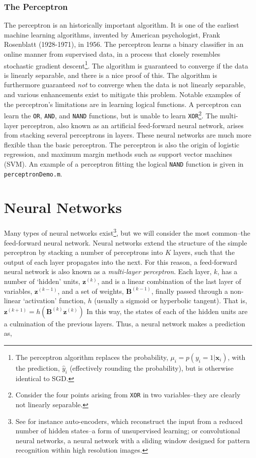 \documentclass[11pt]{amsart}
\begin{document}
\subsubsection{The Perceptron}
The perceptron is an historically important algorithm. It is one of the earliest machine learning algorithms, invented by American psychologist, Frank Rosenblatt (1928-1971), in 1956. The perceptron learns a binary classifier in an online manner from supervised data, in a process that closely resembles stochastic gradient descent\footnote{The perceptron algorithm replaces the probability, $\mu_i = p(y_i = 1 | \mathbf{x}_i)$, with the prediction, $\hat{y}_i$ (effectively rounding the probability), but is otherwise identical to SGD.}. The algorithm is guaranteed to converge if the data is linearly separable, and there is a nice proof of this. The algorithm is furthermore guaranteed \emph{not} to converge when the data is not linearly separable, and various enhancements exist to mitigate this problem. Notable examples of the perceptron's limitations are in learning logical functions. A perceptron can learn the \texttt{OR}, \texttt{AND}, and \texttt{NAND} functions, but is unable to learn \texttt{XOR}\footnote{Consider the four points arising from \texttt{XOR} in two variables--they are clearly not linearly separable.}. The multi-layer perceptron, also known as an artificial feed-forward neural network, arises from stacking several perceptrons in layers. These neural networks are much more flexible than the basic perceptron. The perceptron is also the origin of logistic regression, and maximum margin methods such as support vector machines (SVM). An example of a perceptron fitting the logical \texttt{NAND} function is given in \texttt{perceptronDemo.m}.

\section{Neural Networks}

Many types of neural networks exist\footnote{See for instance auto-encoders, which reconstruct the input from a reduced number of hidden states--a form of unsupervised learning; or convolutional neural networks, a neural network with a sliding window designed for pattern recognition within high resolution images.}, but we will consider the most common--the feed-forward neural network. Neural networks extend the structure of the simple perceptron by stacking a number of perceptrons into $K$ layers, such that the output of each layer propagates into the next. For this reason, a feed-forward neural network is also known as a \emph{multi-layer perceptron}. Each layer, $k$, has a number of `hidden' units, $\mathbf{z}^{(k)}$, and is a linear combination of the last layer of variables, $\mathbf{z}^{(k-1)}$, and a set of weights, $\mathbf{B}^{(k-1)}$, finally passed through a non-linear `activation' function, $h$ (usually a sigmoid or hyperbolic tangent). That is, $\mathbf{z}^{(k+1)} = h(\mathbf{B}^{(k)}\mathbf{z}^{(k)})$ In this way, the states of each of the hidden units are a culmination of the previous layers. Thus, a neural network makes a prediction as,
\end{document}
